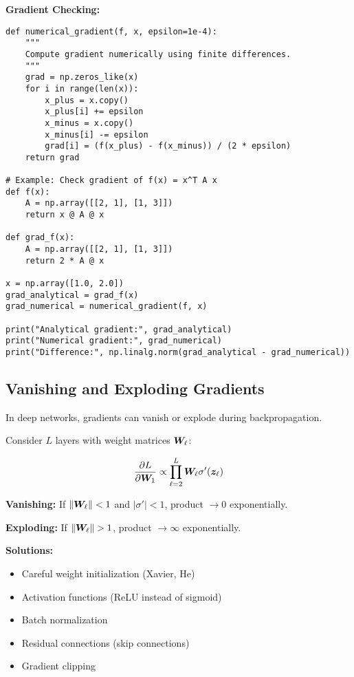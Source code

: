 \begin{codebox}
\textbf{Gradient Checking:}

\begin{lstlisting}
def numerical_gradient(f, x, epsilon=1e-4):
    """
    Compute gradient numerically using finite differences.
    """
    grad = np.zeros_like(x)
    for i in range(len(x)):
        x_plus = x.copy()
        x_plus[i] += epsilon
        x_minus = x.copy()
        x_minus[i] -= epsilon
        grad[i] = (f(x_plus) - f(x_minus)) / (2 * epsilon)
    return grad

# Example: Check gradient of f(x) = x^T A x
def f(x):
    A = np.array([[2, 1], [1, 3]])
    return x @ A @ x

def grad_f(x):
    A = np.array([[2, 1], [1, 3]])
    return 2 * A @ x

x = np.array([1.0, 2.0])
grad_analytical = grad_f(x)
grad_numerical = numerical_gradient(f, x)

print("Analytical gradient:", grad_analytical)
print("Numerical gradient:", grad_numerical)
print("Difference:", np.linalg.norm(grad_analytical - grad_numerical))
\end{lstlisting}
\end{codebox}

\subsection{Vanishing and Exploding Gradients}

In deep networks, gradients can vanish or explode during backpropagation.

\begin{remark}
Consider $L$ layers with weight matrices $\bm{W}_\ell$:

\begin{equation}
    \frac{\partial L}{\partial \bm{W}_1} \propto \prod_{\ell=2}^L \bm{W}_\ell \sigma'(\bm{z}_\ell)
\end{equation}

\textbf{Vanishing:} If $\|\bm{W}_\ell\| < 1$ and $|\sigma'| < 1$, product $\to 0$ exponentially.

\textbf{Exploding:} If $\|\bm{W}_\ell\| > 1$, product $\to \infty$ exponentially.

\textbf{Solutions:}
\begin{itemize}
    \item Careful weight initialization (Xavier, He)
    \item Activation functions (ReLU instead of sigmoid)
    \item Batch normalization
    \item Residual connections (skip connections)
    \item Gradient clipping
\end{itemize}
\end{remark}

